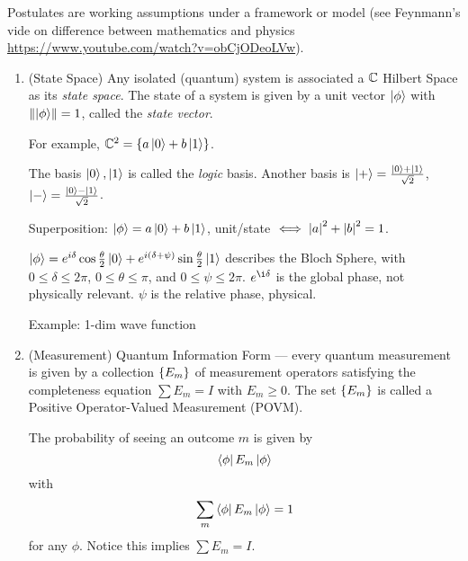 Postulates are working assumptions under a framework or model (see Feynmann's
vide on difference between mathematics and physics \url{https://www.youtube.com/watch?v=obCjODeoLVw}).


\begin{enumerate}[label=Postulate \arabic*.]
    \item (State Space) Any isolated (quantum) system is associated a $\mathbb{C}$
          Hilbert Space as its \emph{state space}. The state of a system is given by a unit vector
          $\left|\phi\right\rangle$ with $\left\lVert\left|\phi\right\rangle\right\rVert = 1$, called the \emph{state vector}.

          For example, $\mathbb{C}^2 = \left\lbrace a\left|0\right\rangle + b\left|1\right\rangle\right\rbrace$.

          The basis $\left|0\right\rangle, \left|1\right\rangle$ is called the \emph{logic} basis. Another basis
          is $\left|+\right\rangle = \frac{\left|0\right\rangle + \left|1\right\rangle}{\sqrt{2}}$, $\left|-\right\rangle = \frac{\left|0\right\rangle - \left|1\right\rangle}{\sqrt{2}}$.

          Superposition: $\left|\phi\right\rangle = a\left|0\right\rangle + b\left|1\right\rangle$, unit/state $\iff \left\lvert a\right\rvert^2 + \left\lvert b\right\rvert^2 = 1$.

          $\left|\phi\right\rangle = e^{i\delta}\cos\frac{\theta}{2}\left|0\right\rangle + e^{i(\delta+\psi)}\sin\frac{\theta}{2}\left|1\right\rangle$ describes
          the Bloch Sphere, with $0 \leq \delta \leq 2\pi$, $0 \leq \theta \leq \pi$, and
          $0 \leq \psi \leq 2\pi$. $e^{\i\delta}$ is the global phase, not physically relevant.
          $\psi$ is the relative phase, physical.


          Example: 1-dim wave function %

    \item (Measurement) Quantum Information Form --- every quantum measurement is given
          by a collection $\left\lbrace E_m\right\rbrace$ of measurement operators satisfying the completeness
          equation $\sum E_m = I$ with $E_m \geq 0$. The set $\left\lbrace E_m\right\rbrace$ is called a
          Positive Operator-Valued Measurement (POVM).

          The probability of seeing an outcome $m$ is given by \[\left\langle \phi\right|E_m\left|\phi\right\rangle\]
          with
          \[\sum_{m}\left\langle \phi\right|E_m\left|\phi\right\rangle = 1\]
          for any $\phi$. Notice this implies $\sum E_m = I$.


\end{enumerate}
